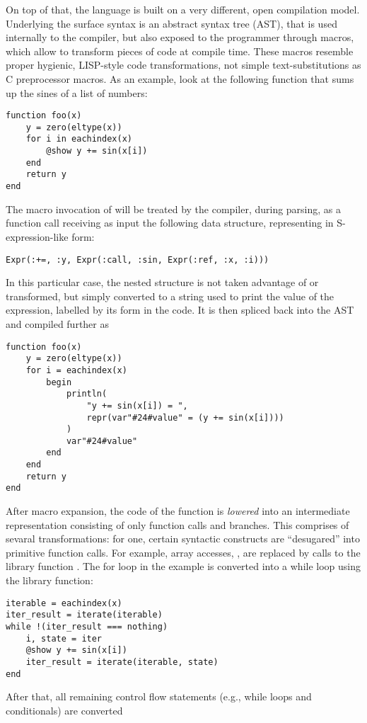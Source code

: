 On top of that, the language is built on a very different, open compilation model.  Underlying the
surface syntax is an abstract syntax tree (AST), that is used internally to the compiler, but also
exposed to the programmer through macros, which allow to transform pieces of code at compile time.
These macros resemble proper hygienic, LISP-style code transformations, not simple
text-substitutions as C preprocessor macros.  As an example, look at the following function that
sums up the sines of a list of numbers:
\begin{lstlisting}
function foo(x)
    y = zero(eltype(x))
    for i in eachindex(x)
        @show y += sin(x[i])
    end
    return y
end
\end{lstlisting}
The macro invocation of  will be treated by the compiler, during parsing, as a function
call receiving as input the following data structure, representing  in
S-expression-like form:
\begin{lstlisting}
Expr(:+=, :y, Expr(:call, :sin, Expr(:ref, :x, :i)))
\end{lstlisting}
In this particular case, the nested structure is not taken advantage of or transformed, but simply
converted to a string used to print the value of the expression, labelled by its form in the code.
It is then spliced back into the AST and compiled further as
\begin{lstlisting}
function foo(x)
    y = zero(eltype(x))
    for i = eachindex(x)
        begin
            println(
                "y += sin(x[i]) = ",
                repr(var"#24#value" = (y += sin(x[i])))
            )
            var"#24#value"
        end
    end
    return y
end
\end{lstlisting}
After macro expansion, the code of the function is \emph{lowered} into an intermediate
representation consisting of only function calls and branches.  This comprises of sevaral
transformations: for one, certain syntactic constructs are \enquote{desugared} into primitive
function calls.  For example, array accesses, , are replaced by calls to the library
function .  The for loop in the example is converted into a while loop using
the  library function:
\begin{lstlisting}
iterable = eachindex(x)
iter_result = iterate(iterable)
while !(iter_result === nothing)
    i, state = iter
    @show y += sin(x[i])
    iter_result = iterate(iterable, state)
end
\end{lstlisting}
After that, all remaining control flow statements (e.g., while loops and conditionals) are converted
